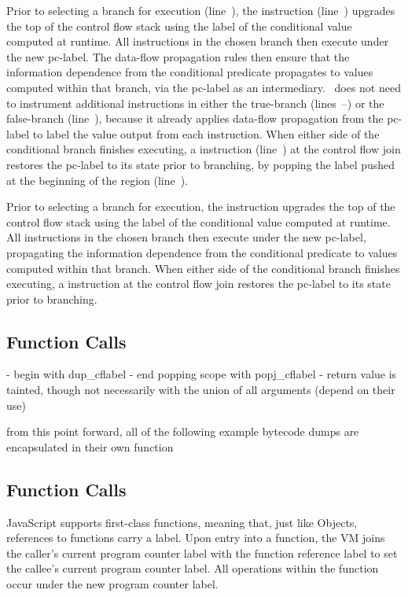 Prior to selecting a branch for execution (line~), the \join instruction (line~) upgrades the top of the control flow stack using the label of the conditional value computed at runtime.
All instructions in the chosen branch then execute under the new pc-label.
The data-flow propagation rules then ensure that the information dependence from the conditional predicate propagates to values computed within that branch, via the pc-label as an intermediary.
\FlowCore\ does not need to instrument additional instructions in either the true-branch (lines~--) or the false-branch (line~), because it already applies data-flow propagation from the pc-label to label the value output from each instruction.
When either side of the conditional branch finishes executing, a \popj instruction (line~) at the control flow join restores the pc-label to its state prior to branching, by popping the label pushed at the beginning of the region (line~).


Prior to selecting a branch for execution, the \join instruction upgrades the top of the control flow stack using the label of the conditional value computed at runtime.
All instructions in the chosen branch then execute under the new pc-label, propagating the information dependence from the conditional predicate to values computed within that branch.
When either side of the conditional branch finishes executing, a \popj instruction at the control flow join restores the pc-label to its state prior to branching.


\subsection{Function Calls}

- begin with dup\_cflabel
- end popping scope with popj\_cflabel
- return value is tainted, though not necessarily with the union of all arguments (depend on their use)

from this point forward, all of the following example bytecode dumps are encapsulated in their own function




\subsection{Function Calls}

JavaScript supports first-class functions, meaning that, just like Objects, references to functions carry a label.
Upon entry into a function, the VM joins the caller's current program counter label with the function reference label to set the callee's current program counter label.
All operations within the function occur under the new program counter label.

